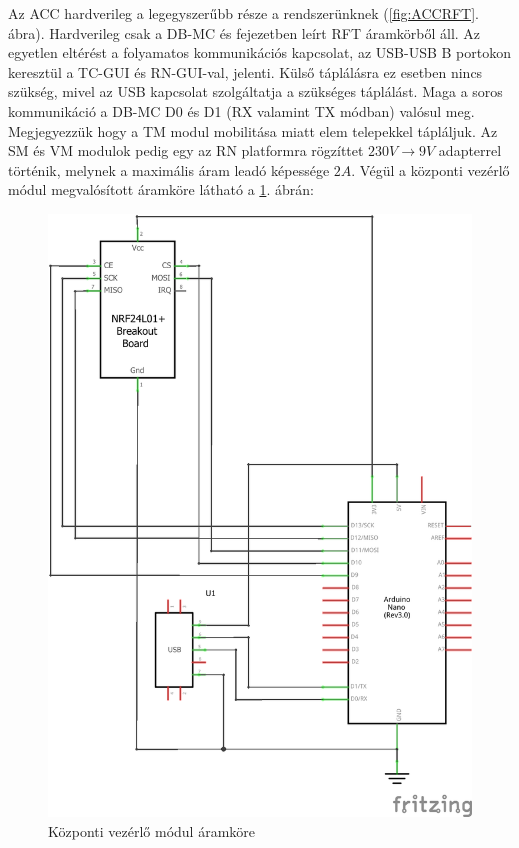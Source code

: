 \documentclass[a4paper,12pt]{article}
\begin{document}
Az ACC hardverileg a legegyszerűbb része a rendszerünknek (\ref{fig:ACCRFT}. ábra).
Hardverileg csak a DB-MC és \textit{} fejezetben leírt RFT áramkörből áll.
Az egyetlen eltérést a folyamatos kommunikációs kapcsolat, az USB-USB B portokon keresztül a TC-GUI és RN-GUI-val, jelenti.
Külső táplálásra ez esetben nincs szükség, mivel az USB kapcsolat szolgáltatja a szükséges táplálást.
Maga a soros kommunikáció a DB-MC D0 és D1 (RX valamint TX módban) valósul meg.
Megjegyezzük hogy a TM modul mobilitása miatt elem telepekkel tápláljuk.
Az SM és VM modulok pedig egy az RN platformra rögzíttet $230V\rightarrow 9V$ adapterrel történik, melynek a maximális áram leadó képessége $2A$.
Végül a központi vezérlő módul megvalósított áramköre látható a \ref{fig:circuit_central_module}. ábrán:

\begin{figure}[!htp]
    \centering
	\includegraphics[scale=1]{images/circuit_central_module.png}
    \caption[Központi vezérlő módul áramköre]{Központi vezérlő módul áramköre}
	\label{fig:circuit_central_module}
\end{figure}
\end{document}
